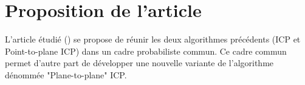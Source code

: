 \section{Proposition de l'article}

L'article étudié (\cite{bib_gicp}) se propose de réunir les deux algorithmes précédents (ICP et Point-to-plane ICP) dans un cadre probabiliste commun. Ce cadre commun permet d'autre part de développer une nouvelle variante de l'algorithme dénommée "Plane-to-plane" ICP.